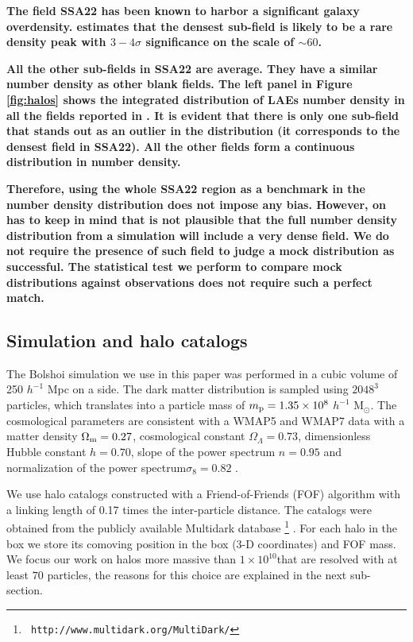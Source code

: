 \documentclass[usenatbib]{mn2e}
\newcommand{\hMpc}{{\ifmmode{h^{-1}{\rm Mpc}}\else{$h^{-1}$Mpc }\fi}}
\newcommand{\hMsun}{{\ifmmode{h^{-1}{\rm
        {M_{\odot}}}}\else{$h^{-1}{\rm{M_{\odot}}}$}\fi}}
\begin{document}
{\bf The field SSA22 has been known to harbor a significant
  galaxy overdensity. \cite{Yamada2012} estimates that the densest
  sub-field is likely to be a rare density peak with $3-4\sigma$
  significance on the scale of $\sim 60$\hMpc. }

{\bf All the other sub-fields in SSA22 are average. They have a similar
  number density as other blank fields. The left panel in Figure
  \ref{fig:halos} shows the integrated distribution of LAEs number
  density in all the fields reported in  \cite{Yamada2012}. It is
  evident that there is only one sub-field  that stands out as an
  outlier in the distribution (it corresponds to  the densest field in
  SSA22). All the other fields form a continuous  distribution in
  number density.}   

{\bf Therefore, using the whole SSA22 region as a benchmark in the
  number density distribution does not impose any bias. However, on
  has to  keep in mind that is not plausible that the full number
  density distribution from a simulation will include a very dense
  field. We do not require the presence of such field to judge a mock
  distribution as successful. The statistical test we perform to
  compare mock distributions   against   observations does not require
  such a perfect match. }
  


\subsection{Simulation and halo catalogs}

The Bolshoi simulation \citep{Bolshoi} we use in this paper was
performed in a cubic volume of 250 $h^{-1}$ Mpc on a side. The
dark matter distribution is sampled using $2048^{3}$ particles, which
translates into a particle mass of $m_{\rm p}=1.35\times 10^{8}$
$h^{-1}$ M$_{\odot}$.  The cosmological parameters are consistent with
a WMAP5 and WMAP7 data with a matter density $\Omega_{\rm m} = 0.27$,
cosmological constant $\Omega_{\Lambda}=0.73$, dimensionless Hubble constant
$h=0.70$, slope of the power spectrum $n=0.95$ and normalization of the
power spectrum$\sigma_{8}=0.82$ \citep{Komatsu2009,Jarosik2011}.  

We use halo catalogs constructed with a Friend-of-Friends (FOF)
algorithm with a linking length of 0.17 times the inter-particle
distance. The catalogs were obtained from the publicly available
Multidark database \footnote{{\tt
    http://www.multidark.org/MultiDark/}}
\citep{MultiDark}. For each halo in the box we store its
comoving position in the box (3-D coordinates) and FOF mass. We focus our work
on halos more massive than $1\times 10^{10}$\hMsun that are resolved
with at least $70$ particles, the reasons for this choice are
explained in the next sub-section.  
\end{document}
